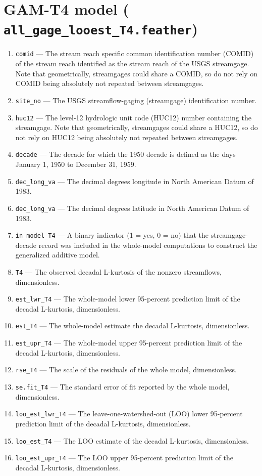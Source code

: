 \documentclass[1p, authoryear, 11pt, times, preprint]{elsarticle}
\newcommand{\code}[1]{{\color{black}%
                       \mbox{\lstinline[basicstyle={\small\ttfamily},
                                        keywordstyle=\scriptsize\ttfamily]|#1|}}}
\begin{document}
\section{GAM-T4 model (\code{all_gage_looest_T4.feather})}
\begin{enumerate}
\footnotesize
\RaggedRight
\item \code{comid} --- The stream reach specific common identification number (COMID) of the stream reach identified as the stream reach of the USGS streamgage. Note that geometrically, streamgages could share a COMID, so do not rely on COMID being absolutely not repeated between streamgages.
\item \code{site_no} --- The USGS streamflow-gaging (streamgage) identification number.
\item \code{huc12} --- The level-12 hydrologic unit code (HUC12) number containing the streamgage. Note that geometrically, streamgages could share a HUC12, so do not rely on HUC12 being absolutely not repeated between streamgages.
\item \code{decade} --- The decade for which the 1950 decade is defined as the days January 1, 1950 to December 31, 1959.
\item \code{dec_long_va} --- The decimal degrees longitude in North American Datum of 1983.
\item \code{dec_long_va} --- The decimal degrees latitude in North American Datum of 1983.
\item \code{in_model_T4} --- A binary indicator (1 = yes, 0 = no) that the streamgage-decade record was included in the whole-model computations to construct the generalized additive model.
\item \code{T4} --- The observed decadal L-kurtosis of the nonzero streamflows, dimensionless.
\item \code{est_lwr_T4} --- The whole-model lower 95-percent prediction limit of the decadal L-kurtosis, dimensionless.
\item \code{est_T4} --- The whole-model estimate the decadal L-kurtosis, dimensionless.
\item \code{est_upr_T4} --- The whole-model upper 95-percent prediction limit of the decadal L-kurtosis, dimensionless.
\item \code{rse_T4} --- The scale of the residuals of the whole model, dimensionless.
\item \code{se.fit_T4} --- The standard error of fit reported by the whole model, dimensionless.
\item \code{loo_est_lwr_T4} --- The leave-one-watershed-out (LOO) lower 95-percent prediction limit of the decadal L-kurtosis, dimensionless.
\item \code{loo_est_T4} --- The LOO estimate of the decadal L-kurtosis, dimensionless.
\item \code{loo_est_upr_T4} --- The LOO upper 95-percent prediction limit of the decadal  L-kurtosis, dimensionless.
\end{enumerate}
\end{document}
